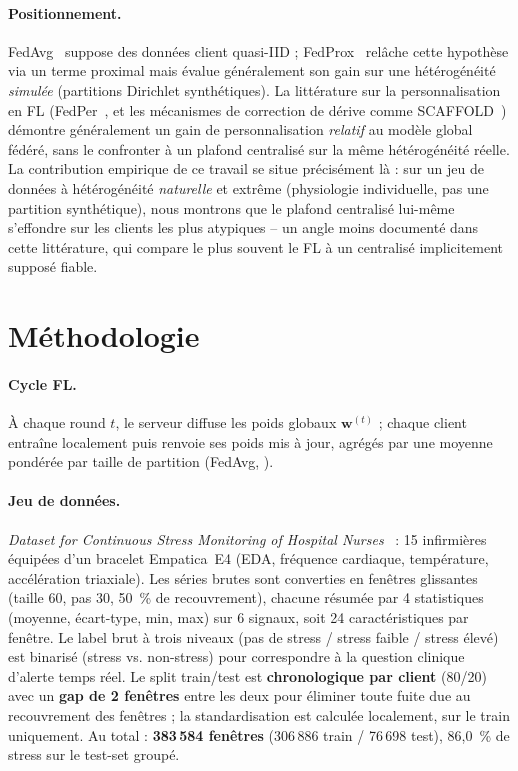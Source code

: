 \documentclass{acmart}
\begin{document}
\paragraph{Positionnement.} FedAvg~\cite{mcmahan2017communication} suppose des données
client quasi-IID ; FedProx~\cite{li2020fedprox} relâche cette hypothèse via un terme
proximal mais évalue généralement son gain sur une hétérogénéité \emph{simulée}
(partitions Dirichlet synthétiques). La littérature sur la personnalisation en FL
(FedPer~\cite{arivazhagan2019federated}, et les mécanismes de correction de dérive
comme SCAFFOLD~\cite{karimireddy2020scaffold}) démontre généralement un gain de
personnalisation \emph{relatif} au modèle global fédéré, sans le confronter à un
plafond centralisé sur la même hétérogénéité réelle. La contribution empirique de ce
travail se situe précisément là : sur un jeu de données à hétérogénéité \emph{naturelle}
et extrême (physiologie individuelle, pas une partition synthétique), nous montrons que
le plafond centralisé lui-même s'effondre sur les clients les plus atypiques -- un
angle moins documenté dans cette littérature, qui compare le plus souvent le FL à un
centralisé implicitement supposé fiable.

\section{Méthodologie}
\label{sec:method}

\paragraph{Cycle FL.} À chaque round $t$, le serveur diffuse les poids globaux
$\mathbf{w}^{(t)}$ ; chaque client entraîne localement puis renvoie ses poids mis à
jour, agrégés par une moyenne pondérée par taille de partition (FedAvg,
\cite{mcmahan2017communication}).

\paragraph{Jeu de données.} \textit{Dataset for Continuous Stress Monitoring of
Hospital Nurses}~\cite{nurse_stress_dataset} : 15 infirmières équipées d'un bracelet
Empatica~E4 (EDA, fréquence cardiaque, température, accélération triaxiale). Les
séries brutes sont converties en fenêtres glissantes (taille 60, pas 30, 50~\% de
recouvrement), chacune résumée par 4 statistiques (moyenne, écart-type, min, max) sur
6 signaux, soit 24 caractéristiques par fenêtre. Le label brut à trois niveaux (pas de
stress / stress faible / stress élevé) est binarisé (stress vs. non-stress) pour
correspondre à la question clinique d'alerte temps réel. Le split train/test est
\textbf{chronologique par client} (80/20) avec un \textbf{gap de 2 fenêtres} entre les
deux pour éliminer toute fuite due au recouvrement des fenêtres ; la standardisation
est calculée localement, sur le train uniquement. Au total : \textbf{383\,584
fenêtres} (306\,886 train / 76\,698 test), 86,0~\% de stress sur le test-set groupé.
\end{document}
